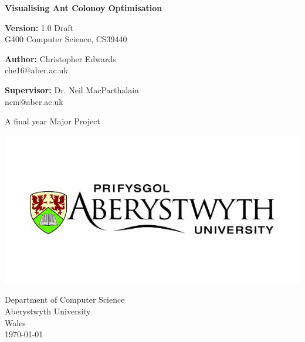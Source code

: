 \documentclass[10pt,a4paper]{article}
\begin{document}
\begin{titlepage}
\thispagestyle{empty}
    \begin{center}
        \vspace{1cm}
        
        \Huge
        \textbf{Visualising Ant Colonoy Optimisation}
        
	 \vspace{0.5cm}
        \Large
	 \textbf{Version:} 1.0 Draft \\
        G400  Computer Science, CS39440
	  

        \vspace{1.0cm}
        
	  \Large
        \textbf{Author:} Christopher Edwards \\
         che16@aber.ac.uk

 	  \vspace{0.8cm}
 	  \textbf{Supervisor:} Dr. Neil MacParthalain \\
         ncm@aber.ac.uk
        
        \vspace{1.5cm}
           A final year Major Project
           
       \includegraphics[scale=0.6]{unilogo}
        
  
                
        \vspace{0.8cm}
                
        \Large
        Department of Computer Science\\
        Aberystwyth University\\
        Wales\\
        \today
        
	\end{center}
\end{titlepage}
\end{document}
